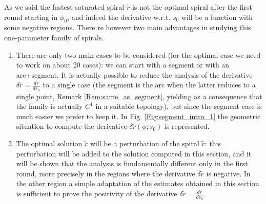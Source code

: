 \documentclass[reqno]{amsart}
\theoremstyle{definition} \newtheorem{definition}{Definition}[section]
\theoremstyle{definition} \newtheorem{remark}[definition]{Remark}
\theoremstyle{plain} \newtheorem{lemma}[definition]{Lemma}
\theoremstyle{plain} \newtheorem{proposition}[definition]{Proposition}
\theoremstyle{plain} \newtheorem{theorem}[definition]{Theorem}
\theoremstyle{plain} \newtheorem{corollary}[definition]{Corollary}
\theoremstyle{definition} \newtheorem{example}[definition]{Example}
\theoremstyle{plain} \newtheorem{claim}[clai]{Claim}
\theoremstyle{definition} \newtheorem{assumption}[definition]{Assumption}
\theoremstyle{definition} \newtheorem{observation}[definition]{Observation}
\newcommand{\1}{\mathbbm 1}
\numberwithin{equation}{section} %
\theoremstyle{plain} \newtheorem*{theorem*}{Theorem}
\theoremstyle{plain} \newtheorem{mthm}[maintheorem]{Main Theorem}
\theoremstyle{plain} \newtheorem*{mthm*}{Main Theorem}
\theoremstyle{plain} \newtheorem*{conjecture*}{Conjecture}
\theoremstyle{plain} \newtheorem{conjecture}[definition]{Conjecture}
\theoremstyle{plain} \newtheorem*{problem*}{Problem}
\begin{document}
As we said the fastest saturated spiral $\tilde r$ is not the optimal spiral after the first round starting in $\phi_0$, and indeed the derivative w.r.t. $s_0$ will be a function with some negative regions. There re however two main advantages in studying this one-parameter family of spirals.
\begin{enumerate}
\item There are only two main cases to be considered (for the optimal case we need to work on about 20 cases): we can start with a segment or with an arc+segment. It is actually possible to reduce the analysis of the derivative $\delta \tilde r = \frac{d\tilde r}{ds_0}$ to a single case (the segment is the arc when the latter reduces to a single point, Remark \ref{Rem:same_as_segment}, yielding as a consequence that the family is actually $C^1$ in a suitable topology), but since the segment case is much easier we prefer to keep it. In Fig. \ref{Fig:segment_intro_1} the geometric situation to compute the derivative $\delta \tilde r(\phi;s_0)$ is represented.

\item The optimal solution $\check r$ will be a perturbation of the spiral $\tilde r$: this perturbation will be added to the solution computed in this section, and it will be shown that the analysis is fundamentally different only in the first round, more precisely in the regions where the derivative $\delta \tilde r$ is negative. In the other region a simple adaptation of the estimates obtained in this section is sufficient to prove the positivity of the derivative $\delta \check r = \frac{d\check r}{ds_0}$.
\end{enumerate}
\end{document}
